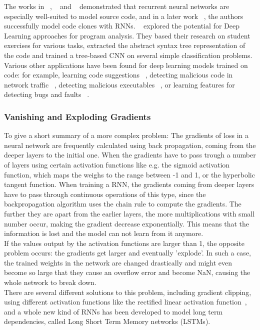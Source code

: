 \documentclass[
	a4paper,
	pagesize,
	pdftex,
	12pt,
	twoside, %
	BCOR=5mm, %
	ngerman,
	fleqn,
	final,
	]{scrartcl}
\begin{document}
The works in ~\cite{White.2015}, ~\cite{Dam.2016b} and ~\cite{Dam.2016} demonstrated that recurrent neural networks are especially well-suited to model source code, and in a later work ~\cite{White.2016}, the authors successfully model code clones with RNNs. ~\cite{Mou.2014} explored the potential for Deep Learning approaches for program analysis. They based their research on student exercises for various tasks, extracted the abstract syntax tree representation of the code and trained a tree-based CNN on several simple classification problems. Various other applications have been found for deep learning models trained on code: for example, learning code suggestions ~\cite{Bhoopchand.2016}, detecting malicious code in network traffic ~\cite{Elovici.2007}, detecting malicious executables ~\cite{Schultz.2000}, or learning features for detecting bugs and faults ~\cite{Huo.2016,Gupta.2017b}. 

\subsubsection{Vanishing and Exploding Gradients}
To give a short summary of a more complex problem: The gradients of loss in a neural network are frequently calculated using back propagation, coming from the deeper layers to the initial one. When the gradients have to pass trough a number of layers using certain activation functions like e.g. the sigmoid activation function, which maps the weighs to the range between -1 and 1, or the hyperbolic tangent function. When training a RNN, the gradients coming from deeper layers have to pass through continuous operations of this type, since the backpropagation algorithm uses the chain rule to compute the gradients. The further they are apart from the earlier layers, the more multiplications with small number occur, making the gradient decrease exponentially. This means that the information is lost and the model can not learn from it anymore.\\
If the values output by the activation functions are larger than 1, the opposite problem occurs: the gradients get larger and eventually 'explode'. In such a case, the trained weights in the network are changed drastically and might even become so large that they cause an overflow error and become NaN, causing the whole network to break down.\\ %
There are several different solutions to this problem, including gradient clipping, using different activation functions like the rectified linear activation function~\cite{Glorot.2011}, and a whole new kind of RNNs has been developed to model long term dependencies, called Long Short Term Memory networks (LSTMs).
\end{document}

